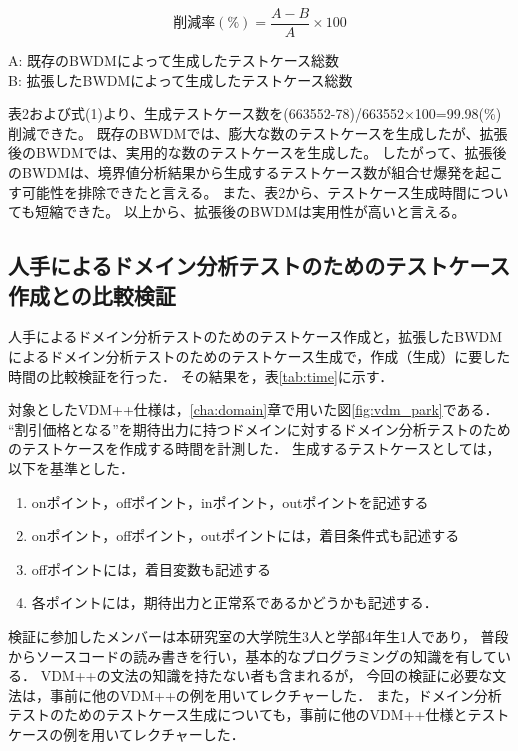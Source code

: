 \documentclass[uplatex, report, a4j, 10pt]{jsbook}
\begin{document}
\begin{equation}
  削減率(\%) = \frac{A - B}{A} \times 100
\end{equation}

\begin{center}
  A: 既存のBWDMによって生成したテストケース総数\\
  B: 拡張したBWDMによって生成したテストケース総数\\
\end{center}

表2および式(1)より、生成テストケース数を(663552-78)/663552×100=99.98(\%)削減できた。
既存のBWDMでは、膨大な数のテストケースを生成したが、拡張後のBWDMでは、実用的な数のテストケースを生成した。
したがって、拡張後のBWDMは、境界値分析結果から生成するテストケース数が組合せ爆発を起こす可能性を排除できたと言える。
また、表2から、テストケース生成時間についても短縮できた。
以上から、拡張後のBWDMは実用性が高いと言える。

\subsection{人手によるドメイン分析テストのためのテストケース作成との比較検証}

人手によるドメイン分析テストのためのテストケース作成と，拡張したBWDMによるドメイン分析テストのためのテストケース生成で，作成（生成）に要した時間の比較検証を行った．
その結果を，表\ref{tab:time}に示す．

対象としたVDM++仕様は，\ref{cha:domain}章で用いた図\ref{fig:vdm_park}である．
“割引価格となる”を期待出力に持つドメインに対するドメイン分析テストのためのテストケースを作成する時間を計測した．
生成するテストケースとしては，以下を基準とした．
\begin{enumerate}
  \item onポイント，offポイント，inポイント，outポイントを記述する
  \item onポイント，offポイント，outポイントには，着目条件式も記述する
  \item offポイントには，着目変数も記述する
  \item 各ポイントには，期待出力と正常系であるかどうかも記述する．
\end{enumerate}

検証に参加したメンバーは本研究室の大学院生3人と学部4年生1人であり，
普段からソースコードの読み書きを行い，基本的なプログラミングの知識を有している．
VDM++の文法の知識を持たない者も含まれるが，
今回の検証に必要な文法は，事前に他のVDM++の例を用いてレクチャーした．
また，ドメイン分析テストのためのテストケース生成についても，事前に他のVDM++仕様とテストケースの例を用いてレクチャーした．
\end{document}
